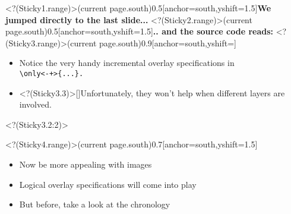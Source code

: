 \BealoverSticky<?(Sticky1.range)>(current page.south){0.5\textwidth}[anchor=south,yshift=1.5\baselineskip]{\bfseries We jumped directly to the last slide...}
%
\BealoverSticky<?(Sticky2.range)>(current page.south){0.5\textwidth}[anchor=south,yshift=1.5\baselineskip]{\bfseries .. and the source code reads:}
%
\BealoverSticky<?(Sticky3.range)>(current page.south){0.9\textwidth}[anchor=south,yshift=\baselineskip]{\bfseries
\begin{itemize}
\item [\myBulb]Notice the very handy incremental overlay specifications in\\
%
\texttt{\color{MyGreen}\backslash only<-+>\{...\}.%
}
\item<?(Sticky3.3)>[\myBulb]Unfortunately, they won't help when different layers are involved.
\end{itemize}
}
\BealoverStickyStack<?(Sticky3.2:2)>{%
}%

%
\BealoverSticky<?(Sticky4.range)>(current page.south){0.7\textwidth}[anchor=south,yshift=1.5\baselineskip]{\bfseries
\begin{itemize}[<?(++Sticky4)->]
\item[\myBulb] Now be more appealing with images
\item[\myBulb] Logical overlay specifications will come into play
\item[\myBulb] But before, take a look at the chronology
\end{itemize}
}
